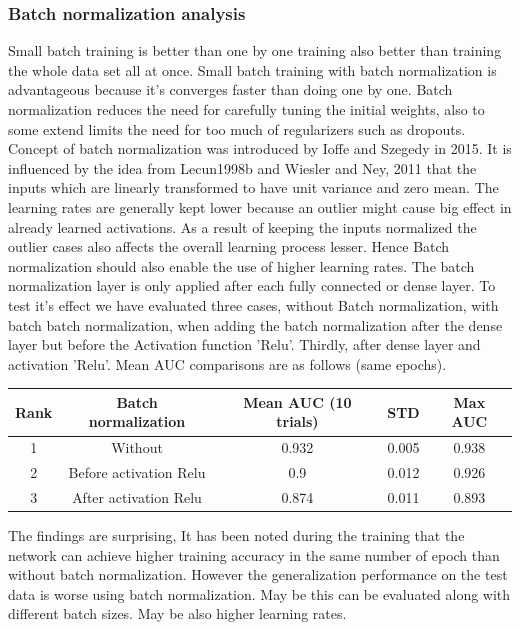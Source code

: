 \flushbottom
\newpage

\subsubsection{Batch normalization analysis}
Small batch training is better than one by one training also better than
training the whole data set all at once. Small batch training with batch normalization is advantageous because it's converges faster than doing one by one. Batch normalization reduces the need for carefully tuning the 
initial weights, also to some extend limits the need for too much of regularizers such as dropouts. Concept of batch normalization was introduced by Ioffe and Szegedy in 2015. It is influenced by the idea from Lecun1998b and 
Wiesler and Ney, 2011 that the inputs which are linearly transformed to have unit variance and zero mean. The learning rates are generally kept lower because 
an outlier might cause big effect in already learned activations. As a result of keeping the inputs normalized the outlier cases also affects the overall learning process lesser. Hence Batch normalization
should also enable the use of higher learning rates. The batch normalization layer is only applied after each fully connected or dense layer. To test it's effect we have evaluated three cases, without Batch normalization, 
with batch batch normalization, when adding the batch normalization after the dense layer but before the Activation function 'Relu'. Thirdly, after dense layer and activation 'Relu'. Mean AUC comparisons are as follows
(same epochs).
\begin{center}
    \begin{tabular}{||c c c c c||} 
      \hline\hline
      Rank & Batch normalization & Mean AUC (10 trials) & STD & Max AUC\\[0.5ex] 
      \hline
      1 & Without &  0.932 & 0.005 & 0.938\\      
      \hline
      2 & Before activation Relu & 0.9 & 0.012 & 0.926\\   
      \hline
      3 & After activation Relu &  0.874 & 0.011 & 0.893\\   
      \hline
    \end{tabular}
  \label{table:batch_normalization}
\end{center}
The findings are surprising, It has been noted during the training that the network can achieve higher training accuracy in the same number of epoch than without batch normalization. However the generalization performance on the 
test data is worse using batch normalization. May be this can be evaluated along with different batch sizes. May be also higher learning rates. %

